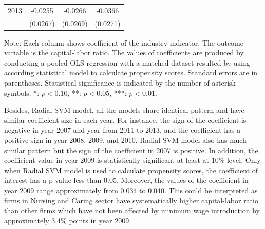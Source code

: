 \documentclass[11pt,a4paper,oneside]{article}
\begin{document}
\begin{table}[!t]
\begin{threeparttable}
\begin{tabular}{*7c}
		\multicolumn{1}{l}{2013} & \multicolumn{2}{c}{-0.0255} & \multicolumn{2}{c}{-0.0266} & \multicolumn{2}{c}{-0.0366}\\
		\multicolumn{1}{l}{} & \multicolumn{2}{c}{(0.0267)} & \multicolumn{2}{c}{(0.0269)} & \multicolumn{2}{c}{(0.0271)}\\
		\bottomrule
	\end{tabular}
	\begin{tablenotes}
	    \linespread{1}\footnotesize
	    Note: Each column shows coefficient of the industry indicator. The outcome variable is the capital-labor ratio. The values of coefficients are produced by conducting a pooled OLS regression with a matched dataset resulted by using according statistical model to calculate propensity scores. Standard errors are in parentheses. Statistical significance is indicated by the number of asterisk symbols. *: $p<0.10$, **: $p<0.05$, ***: $p<0.01$.
	\end{tablenotes}
	\end{threeparttable}
	\label{table:6}
\end{table}

\par
Besides, Radial SVM model, all the models share identical pattern and have similar coefficient size in each year. For instance, the sign of the coefficient is negative in year 2007 and year from 2011 to 2013, and the coefficient has a positive sign in year 2008, 2009, and 2010. Radial SVM model also has much similar pattern but the sign of the coefficient in 2007 is positive. In addition, the coefficient value in year 2009 is statistically significant at least at 10\% level. Only when Radial SVM model is used to calculate propensity scores, the coefficient of interest has a p-value less than 0.05. Moreover, the values of the coefficient in year 2009 range approximately from 0.034 to 0.040. This could be interpreted as firms in Nursing and Caring sector have systematically higher capital-labor ratio than other firms which have not been affected by minimum wage introduction by approximately 3.4\% points in year 2009.
\end{document}
